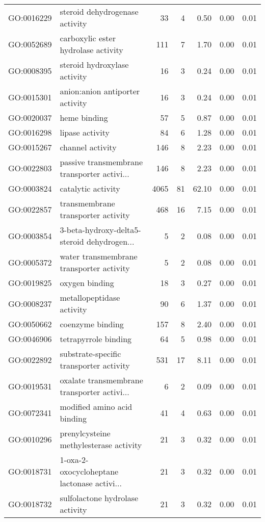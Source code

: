 \begin{table}[ht]
\begin{tabular}{llrrrrr}
  GO:0016229 & steroid dehydrogenase activity &  33 &   4 & 0.50 & 0.00 & 0.01 \\ 
  GO:0052689 & carboxylic ester hydrolase activity & 111 &   7 & 1.70 & 0.00 & 0.01 \\ 
  GO:0008395 & steroid hydroxylase activity &  16 &   3 & 0.24 & 0.00 & 0.01 \\ 
  GO:0015301 & anion:anion antiporter activity &  16 &   3 & 0.24 & 0.00 & 0.01 \\ 
  GO:0020037 & heme binding &  57 &   5 & 0.87 & 0.00 & 0.01 \\ 
  GO:0016298 & lipase activity &  84 &   6 & 1.28 & 0.00 & 0.01 \\ 
  GO:0015267 & channel activity & 146 &   8 & 2.23 & 0.00 & 0.01 \\ 
  GO:0022803 & passive transmembrane transporter activi... & 146 &   8 & 2.23 & 0.00 & 0.01 \\ 
  GO:0003824 & catalytic activity & 4065 &  81 & 62.10 & 0.00 & 0.01 \\ 
  GO:0022857 & transmembrane transporter activity & 468 &  16 & 7.15 & 0.00 & 0.01 \\ 
  GO:0003854 & 3-beta-hydroxy-delta5-steroid dehydrogen... &   5 &   2 & 0.08 & 0.00 & 0.01 \\ 
  GO:0005372 & water transmembrane transporter activity &   5 &   2 & 0.08 & 0.00 & 0.01 \\ 
  GO:0019825 & oxygen binding &  18 &   3 & 0.27 & 0.00 & 0.01 \\ 
  GO:0008237 & metallopeptidase activity &  90 &   6 & 1.37 & 0.00 & 0.01 \\ 
  GO:0050662 & coenzyme binding & 157 &   8 & 2.40 & 0.00 & 0.01 \\ 
  GO:0046906 & tetrapyrrole binding &  64 &   5 & 0.98 & 0.00 & 0.01 \\ 
  GO:0022892 & substrate-specific transporter activity & 531 &  17 & 8.11 & 0.00 & 0.01 \\ 
  GO:0019531 & oxalate transmembrane transporter activi... &   6 &   2 & 0.09 & 0.00 & 0.01 \\ 
  GO:0072341 & modified amino acid binding &  41 &   4 & 0.63 & 0.00 & 0.01 \\ 
  GO:0010296 & prenylcysteine methylesterase activity &  21 &   3 & 0.32 & 0.00 & 0.01 \\ 
  GO:0018731 & 1-oxa-2-oxocycloheptane lactonase activi... &  21 &   3 & 0.32 & 0.00 & 0.01 \\ 
  GO:0018732 & sulfolactone hydrolase activity &  21 &   3 & 0.32 & 0.00 & 0.01 \\ 

\end{tabular}
\end{table}
